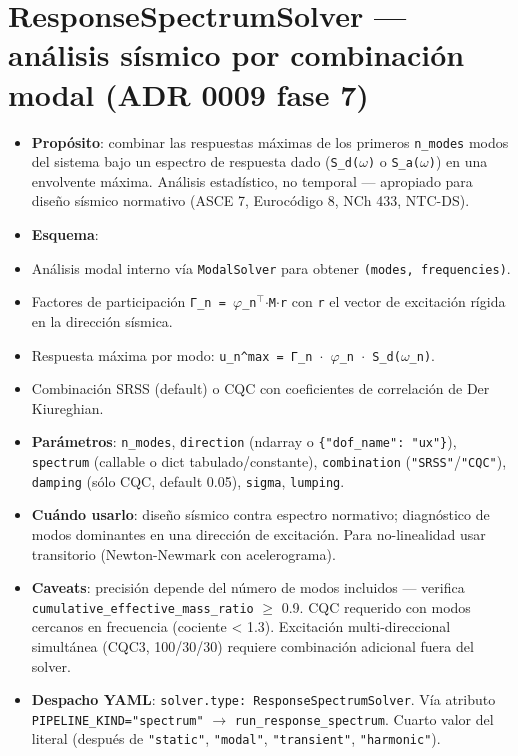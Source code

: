 \documentclass[11pt,letterpaper,oneside]{report}
\begin{document}
\section{ResponseSpectrumSolver --- análisis sísmico por combinación modal (ADR 0009 fase 7)}

\begin{itemize}
  \item \textbf{Propósito}: combinar las respuestas máximas de los primeros \texttt{n\_modes} modos del sistema bajo un espectro de respuesta dado (\texttt{S\_d(\ensuremath{\omega})} o \texttt{S\_a(\ensuremath{\omega})}) en una envolvente máxima. Análisis estadístico, no temporal --- apropiado para diseño sísmico normativo (ASCE 7, Eurocódigo 8, NCh 433, NTC-DS).
  \item \textbf{Esquema}:
  \item Análisis modal interno vía \texttt{ModalSolver} para obtener \texttt{(modes, frequencies)}.
  \item Factores de participación \texttt{Γ\_n = \ensuremath{\varphi}\_n\ensuremath{^{\top}}\ensuremath{\cdot}M\ensuremath{\cdot}r} con \texttt{r} el vector de excitación rígida en la dirección sísmica.
  \item Respuesta máxima por modo: \texttt{u\_n\textasciicircum{}max = Γ\_n \ensuremath{\cdot} \ensuremath{\varphi}\_n \ensuremath{\cdot} S\_d(\ensuremath{\omega}\_n)}.
  \item Combinación SRSS (default) o CQC con coeficientes de correlación de Der Kiureghian.
  \item \textbf{Parámetros}: \texttt{n\_modes}, \texttt{direction} (ndarray o \texttt{\{"dof\_name": "ux"\}}), \texttt{spectrum} (callable o dict tabulado/constante), \texttt{combination} (\texttt{"SRSS"}/\texttt{"CQC"}), \texttt{damping} (sólo CQC, default 0.05), \texttt{sigma}, \texttt{lumping}.
  \item \textbf{Cuándo usarlo}: diseño sísmico contra espectro normativo; diagnóstico de modos dominantes en una dirección de excitación. Para no-linealidad usar transitorio (Newton-Newmark con acelerograma).
  \item \textbf{Caveats}: precisión depende del número de modos incluidos --- verifica \texttt{cumulative\_effective\_mass\_ratio} \ensuremath{\ge} 0.9. CQC requerido con modos cercanos en frecuencia (cociente < 1.3). Excitación multi-direccional simultánea (CQC3, 100/30/30) requiere combinación adicional fuera del solver.
  \item \textbf{Despacho YAML}: \texttt{solver.type: ResponseSpectrumSolver}. Vía atributo \texttt{PIPELINE\_KIND="spectrum"} \ensuremath{\to} \texttt{run\_response\_spectrum}. Cuarto valor del literal (después de \texttt{"static"}, \texttt{"modal"}, \texttt{"transient"}, \texttt{"harmonic"}).

\end{itemize}
\end{document}

